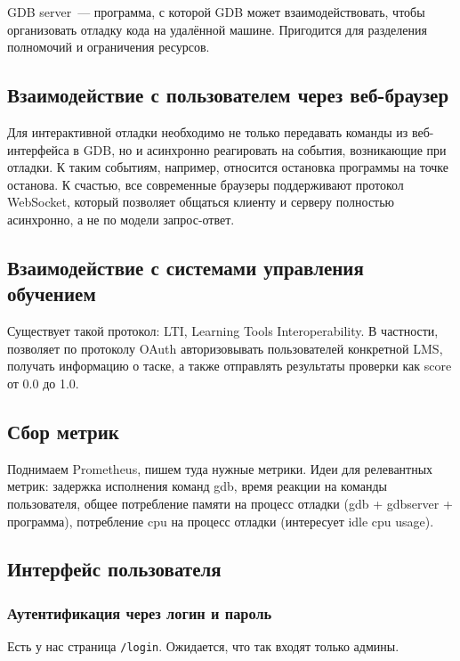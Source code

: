 \documentclass[a4paper,article,14pt]{extarticle}
\begin{document}
GDB server~--- программа, с которой GDB может взаимодействовать, чтобы организовать отладку кода на удалённой машине. Пригодится для разделения полномочий и ограничения ресурсов.

\subsection{Взаимодействие с пользователем через веб-браузер}

Для интерактивной отладки необходимо не только передавать команды из веб-интерфейса в GDB, но и асинхронно реагировать на события, возникающие при отладки. К таким событиям, например, относится остановка программы на точке останова. К счастью, все современные браузеры поддерживают протокол WebSocket, который позволяет общаться клиенту и серверу полностью асинхронно, а не по модели запрос-ответ.

\subsection{Взаимодействие с системами управления обучением}

Существует такой протокол: LTI, Learning Tools Interoperability. В частности, позволяет по протоколу OAuth авторизовывать пользователей конкретной LMS, получать информацию о таске, а также отправлять результаты проверки как score от 0.0 до 1.0.

\subsection{Сбор метрик}

Поднимаем Prometheus, пишем туда нужные метрики. Идеи для релевантных метрик: задержка исполнения команд gdb, время реакции на команды пользователя, общее потребление памяти на процесс отладки (gdb + gdbserver + программа), потребление cpu на процесс отладки (интересует idle cpu usage).

\subsection{Интерфейс пользователя}

\subsubsection{Аутентификация через логин и пароль}

Есть у нас страница \texttt{/login}. Ожидается, что так входят только админы.
\end{document}
